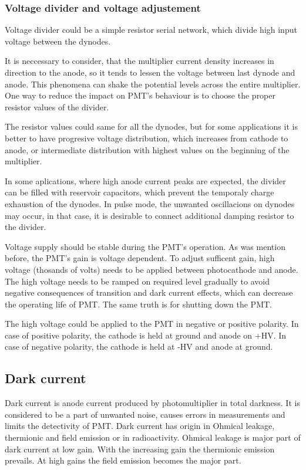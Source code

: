 \subsubsection{Voltage divider and voltage adjustement}
Voltage divider could be a simple resistor serial network, which divide high input voltage between the dynodes. 
\par
It is neccessary to consider, that the multiplier current density increases in direction to the anode, so it tends to lessen the voltage between last dynode and anode. This phenomena can shake the potential levels across the entire multiplier. One way to reduce the impact on PMT's behaviour is to choose the proper resistor values of the divider. 
\par
The resistor values could same for all the dynodes, but for some applications it is better to have progresive voltage distribution, which increases from cathode to anode, or intermediate distribution with highest values on the beginning of the multiplier.

\par
In some aplications, where high anode current peaks are expected, the divider can be filled with reservoir capacitors, which prevent the temporaly charge exhaustion of the dynodes. In pulse mode, the unwanted oscillacions on dynodes may occur, in that case, it is desirable to connect additional damping resistor to the divider.
\par
Voltage supply should be stable during the PMT's operation. As was mention before, the PMT's gain is voltage dependent. To adjust sufficent gain, high voltage (thosands of volts) needs to be applied between photocathode and anode. The high voltage needs to be ramped on required level gradually to avoid negative consequences of transition and dark current effects, which can decrease the operating life of PMT. The same truth is for shutting down the PMT.
\par
The high voltage could be applied to the PMT in negative or positive polarity. In case of positive polarity, the cathode is held at ground and anode on +HV. In case of negative polarity, the cathode is held at -HV and anode at ground. 

\subsection{Dark current}
Dark current is anode current produced by photomultiplier in total darkness. It is considered to be a part of unwanted noise, causes errors in measurements and limits the detectivity of PMT. Dark current has origin in Ohmical leakage, thermionic and field emission or in radioactivity. Ohmical leakage is major part of dark current at low gain. With the increasing gain the thermionic emission prevails. At high gains the field emission becomes the major part.

